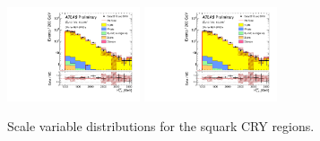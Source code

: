 \begin{figure}[tbph]
\begin{center}
\includegraphics[width=0.35\textwidth]{figures/ATLAS-CONF-2016-078_INT/N-1Plots/AtlasStyle/Preliminary/CRY_SRJigsawSRS3a_LastCut_CRY_minusone}
\includegraphics[width=0.35\textwidth]{figures/ATLAS-CONF-2016-078_INT/N-1Plots/AtlasStyle/Preliminary/CRY_SRJigsawSRS3b_LastCut_CRY_minusone}
\end{center}
\caption{Scale variable distributions for the squark CRY regions.}
\label{fig:CRY_SRJigsawSRS3a_LastCut_CRY_minusone}
\end{figure}
